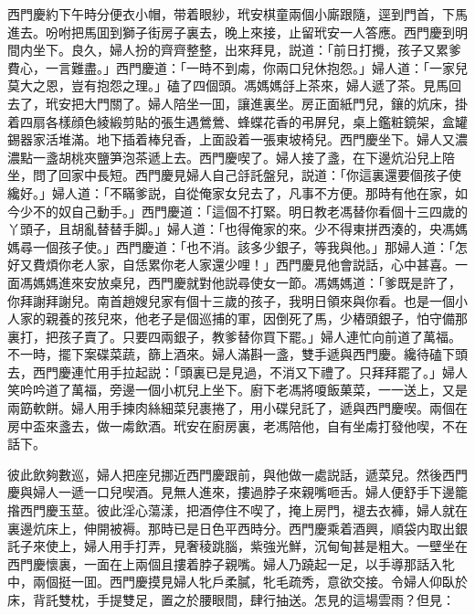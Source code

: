 西門慶約下午時分便衣小帽，带着眼紗，玳安棋童兩個小廝跟隨，逕到門首，下馬進去。吩咐把馬囬到獅子街房子裏去，晚上來接，止留玳安一人答應。西門慶到明間内坐下。良久，婦人扮的齊齊整整，出來拜見，説道：「前日打攪，孩子又累爹費心，一言難盡。」西門慶道：「一時不到䖏，你兩口兒休抱怨。」婦人道：「一家兒莫大之恩，豈有抱怨之理。」磕了四個頭。馮媽媽㧱上茶來，婦人遞了茶。見馬回去了，玳安把大門關了。婦人陪坐一囬，讓進裏坐。房正面紙門兒，鑲的炕床，掛着四扇各樣顔色綾緞剪貼的張生遇鶯鶯、蜂蝶花香的弔屏兒，桌上鑑粧鏡架，盒罐錫器家活堆滿。地下插着棒兒香，上面設着一張東坡椅兒。西門慶坐下。婦人又濃濃點一盞胡桃夾鹽笋泡茶遞上去。西門慶喫了。婦人接了盞，在下邊炕沿兒上陪坐，問了回家中長短。西門慶見婦人自己㧱託盤兒，説道：「你這裏還要個孩子使纔好。」婦人道：「不瞞爹説，自從俺家女兒去了，凡事不方便。那時有他在家，如今少不的奴自己動手。」西門慶道：「這個不打緊。明日教老馮替你看個十三四歲的丫頭子，且胡亂替替手脚。」婦人道：「也得俺家的來。少不得東拼西湊的，央馮媽媽尋一個孩子使。」西門慶道：「也不消。該多少銀子，等我與他。」那婦人道：「怎好又費煩你老人家，自恁累你老人家還少哩！」西門慶見他會説話，心中甚喜。一面馮媽媽進來安放桌兒，西門慶就對他説尋使女一節。馮媽媽道：「爹既是許了，你拜謝拜謝兒。南首趙嫂兒家有個十三歲的孩子，我明日領來與你看。也是一個小人家的親養的孩兒來，他老子是個巡捕的軍，因倒死了馬，少樁頭銀子，怕守備那裏打，把孩子賣了。只要四兩銀子，教爹替你買下罷。」婦人連忙向前道了萬福。不一時，擺下案碟菜蔬，篩上酒來。婦人滿斟一盞，雙手遞與西門慶。纔待磕下頭去，西門慶連忙用手拉起説：「頭裏已是見過，不消又下禮了。只拜拜罷了。」婦人笑吟吟道了萬福，旁邊一個小杌兒上坐下。廚下老馮將嗄飯菓菜，一一送上，又是兩筯軟餅。婦人用手揀肉絲細菜兒裹捲了，用小碟兒託了，遞與西門慶喫。兩個在房中盃來盞去，做一䖏飲酒。玳安在廚房裏，老馮陪他，自有坐䖏打發他喫，不在話下。

彼此飲夠數巡，婦人把座兒挪近西門慶跟前，與他做一處説話，遞菜兒。然後西門慶與婦人一遞一口兒喫酒。見無人進來，摟過脖子來親嘴咂舌。婦人便舒手下邊籠揝西門慶玉莖。彼此淫心蕩漾，把酒停住不喫了，掩上房門，褪去衣褲，婦人就在裏邊炕床上，伸開被褥。那時已是日色平西時分。西門慶乘着酒興，順袋内取出銀託子來使上，婦人用手打弄，見奢稜跳腦，紫強光鮮，沉甸甸甚是粗大。一壁坐在西門慶懷裏，一面在上兩個且摟着脖子親嘴。婦人乃蹺起一足，以手導那話入牝中，兩個挺一囬。西門慶摸見婦人牝戶柔膩，牝毛疏秀，意欲交接。令婦人仰臥於床，背託雙枕，手提雙足，置之於腰眼間，肆行抽送。怎見的這場雲雨？但見：

